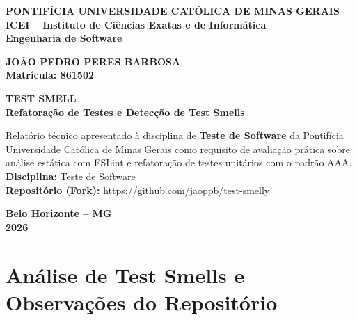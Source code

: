 \documentclass[11pt, a4paper]{article}
\begin{document}
\begin{titlepage}
    \centering
    {\large\textbf{PONTIFÍCIA UNIVERSIDADE CATÓLICA DE MINAS GERAIS}}\\
    {\large\textbf{ICEI -- Instituto de Ciências Exatas e de Informática}}\\
    {\large\textbf{Engenharia de Software}}

    \vspace{2.8cm}
    {\normalsize\textbf{JOÃO PEDRO PERES BARBOSA}}\\
    {\normalsize\textbf{Matrícula: 861502}}

    \vspace{4.2cm}
    {\Large\textbf{TEST SMELL}}\\
    \vspace{0.3cm}
    {\large\textbf{Refatoração de Testes e Detecção de Test Smells}}

    \vspace{3.5cm}
    \begin{flushright}
        \begin{minipage}{0.60\textwidth}
            \small
            Relatório técnico apresentado à disciplina de \textbf{Teste de Software} da Pontifícia Universidade Católica de Minas Gerais como requisito de avaliação prática sobre análise estática com ESLint e refatoração de testes unitários com o padrão AAA.\\[0.3cm]
            \textbf{Disciplina:} Teste de Software\\
            \textbf{Repositório (Fork):} \url{https://github.com/jaoppb/test-smelly}
        \end{minipage}
    \end{flushright}

    \vfill
    {\normalsize\textbf{Belo Horizonte -- MG}}\\
    {\normalsize\textbf{2026}}
\end{titlepage}

\setcounter{page}{2}

\section{Análise de Test Smells e Observações do Repositório}
\end{document}

